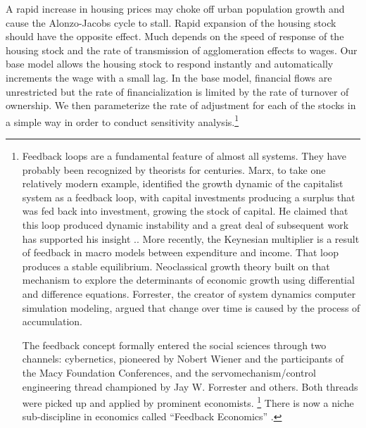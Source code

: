 A rapid increase in housing prices may choke off urban population growth and cause the \Gls{Alonzo-Jacobs cycle} to stall. Rapid expansion of the housing stock should have the opposite effect. Much depends on the speed of response of the housing stock and the rate of transmission of agglomeration effects to wages. Our base model allows the housing stock to respond instantly and automatically increments the wage with a small lag. In the base model, financial flows are unrestricted but the rate of financialization is limited by the rate of turnover of ownership. We then parameterize the rate of adjustment for each of the stocks in a simple way in order to conduct sensitivity analysis.\footnote{Feedback loops are a fundamental feature of almost all systems. They have probably been recognized by theorists for centuries. Marx, to take one relatively modern example, identified the growth dynamic of the capitalist system  as a feedback loop, with capital investments producing a surplus that was fed back into investment, growing the stock of capital. He  claimed that this loop produced dynamic instability and a great deal of subsequent work has supported his insight \cite{dumenilStabilityInstabilityDynamic1986}.\cite{schumpeterInstabilityCapitalism1928}. More recently, the Keynesian multiplier is a result of feedback in macro models between expenditure and income. That loop produces a stable equilibrium. Neoclassical growth theory built on that mechanism to explore the determinants of economic growth using differential and difference equations. Forrester, the creator of system dynamics computer simulation modeling, argued that change over time is caused by the process of accumulation.

The feedback concept formally entered the social sciences through two channels: cybernetics, pioneered by Nobert Wiener  and the participants of the Macy Foundation Conferences, and the servomechanism/control engineering thread championed by Jay W. Forrester and others. Both threads were picked up and applied by prominent economists. \footnote{Richardson \cite{richardsonFeedbackThoughtSocial1991} mentions Oscar Lange (1970), Kenneth Boulding, and Alfred Eichner, Phillips,  R. G. D. Allen (1956), and Axel Leijonhufvud.} There is now a niche sub-discipline in economics called ``Feedback Economics'' \cite{radzickiIntroductionFeedbackEconomics, cavanaFeedbackEconomicsEconomic2021}. %
}


